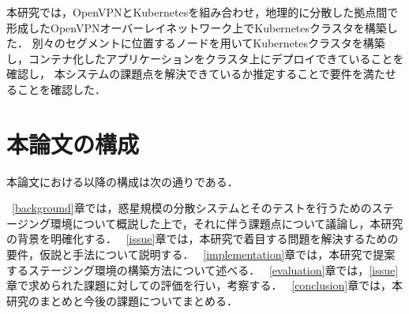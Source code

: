 本研究では，OpenVPNとKubernetesを組み合わせ，地理的に分散した拠点間で形成したOpenVPNオーバーレイネットワーク上でKubernetesクラスタを構築した．
別々のセグメントに位置するノードを用いてKubernetesクラスタを構築し，コンテナ化したアプリケーションをクラスタ上にデプロイできていることを確認し，
本システムの課題点を解決できているか推定することで要件を満たせることを確認した．

\section{本論文の構成}
\label{introduction:structure}

本論文における以降の構成は次の通りである．

~\ref{background}章では，惑星規模の分散システムとそのテストを行うためのステージング環境について概説した上で，それに伴う課題点について議論し，本研究の背景を明確化する．
~\ref{issue}章では，本研究で着目する問題を解決するための要件，仮説と手法について説明する．
~\ref{implementation}章では，本研究で提案するステージング環境の構築方法について述べる．
~\ref{evaluation}章では，\ref{issue}章で求められた課題に対しての評価を行い，考察する．
~\ref{conclusion}章では，本研究のまとめと今後の課題についてまとめる．

